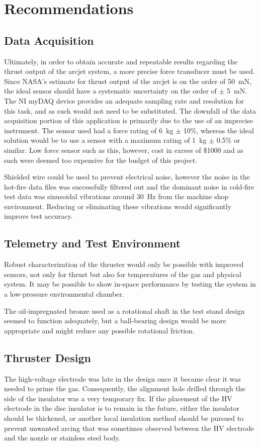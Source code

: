 \documentclass[conference]{IEEEtran}
\begin{document}
\section{Recommendations}
\subsection{Data Acquisition}
Ultimately, in order to obtain accurate and repeatable results regarding the thrust output of the arcjet system, a more precise force transducer must be used.
Since NASA's estimate for thrust output of the arcjet is on the order of \SI{50}{\milli\newton}, the ideal sensor should have a systematic uncertainty on the order of $\pm$ \SI{5}{\milli\newton}.
The NI myDAQ device provides an adequate sampling rate and resolution for this task, and as such would not need to be substituted.
The downfall of the data acquisition portion of this application is primarily due to the use of an imprecise instrument.
The sensor used had a force rating of \SI{6}{\kilo\gram} $\pm$ 10\%, whereas the ideal solution would be to use a sensor with a maximum rating of \SI{1}{\kilo\gram} $\pm$ 0.5\% or similar.
Low force sensor such as this, however, cost in excess of \$1000 and as such were deemed too expensive for the budget of this project.

Shielded wire could be used to prevent electrical noise, however the noise in the hot-fire data files was successfully filtered out and the dominant noise in cold-fire test data was sinusoidal vibrations around \SI{30}{Hz} from the machine shop environment.
Reducing or eliminating these vibrations would significantly improve test accuracy.

\subsection{Telemetry and Test Environment}
Robust characterization of the thruster would only be possible with improved sensors, not only for thrust but also for temperatures of the gas and physical system.
It may be possible to show in-space performance by testing the system in a low-pressure environmental chamber.

The oil-impregnated bronze used as a rotational shaft in the test stand design seemed to function adequately, but a ball-bearing design would be more appropriate and might reduce any possible rotational friction.

\subsection{Thruster Design}
The high-voltage electrode was late in the design once it became clear it was needed to prime the gas.
Consequently, the alignment hole drilled through the side of the insulator was a very temporary fix.
If the placement of the HV electrode in the disc insulator is to remain in the future, either the insulator should be thickened, or another local insulation method should be pursued to prevent unwanted arcing that was sometimes observed between the HV electrode and the nozzle or stainless steel body.
\end{document}
